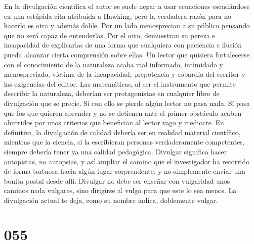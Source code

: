 \documentclass[a4paper,11pt,openright,twocolumn]{book}
\begin{document}
En la divulgación científica el autor se suele negar a usar ecuaciones escudándose en una estúpida cita atribuida a Hawking, pero la verdadera razón para no hacerlo es otra y además doble. Por un lado menosprecian a su público pensando que no será capaz de entenderlas. Por el otro, demuestran su pereza e incapacidad de explicarlas de una forma que cualquiera con paciencia e ilusión pueda alcanzar cierta comprensión sobre ellas. Un lector que quisiera fortalecerse con el conocimiento de la naturaleza acaba mal informado, intimidado y menospreciado, víctima de la incapacidad, prepotencia y cobardía del escritor y las exigencias del editor. Las matemáticas, al ser el instrumento que permite describir la naturaleza, deberían ser protagonistas en cualquier libro de divulgación que se precie. Si con ello se pierde algún lector no pasa nada. Sí pasa que los que quieren aprender y no se detienen ante el primer obstáculo acaben aburridos por unos criterios que benefician al lector vago y mediocre. En definitiva, la divulgación de calidad debería ser en realidad material científico, mientras que la ciencia, si la escribieran personas verdaderamente competentes, siempre debería tener ya una calidad pedagógica. Divulgar significa hacer autopistas, no autopsias, y así ampliar el camino que el investigador ha recorrido de forma tortuosa hacia algún lugar sorprendente, y no simplemente enviar una bonita postal desde allí. Divulgar no debe ser enseñar con vulgaridad unos caminos nada vulgares, sino dirigirse al vulgo para que este lo sea menos. La divulgación actual te deja, como su nombre indica, doblemente vulgar.  


\section*{055}
\end{document}
